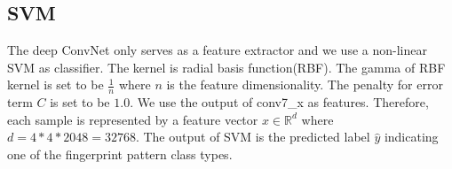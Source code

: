 \subsection{SVM}
\label{sec_svm}
The deep ConvNet only serves as a feature extractor and we use a non-linear SVM as classifier. The kernel is radial basis function(RBF). The gamma of RBF kernel  is set to be $\frac{1}{n}$ where $n$ is the feature dimensionality. The penalty for error term $C$ is set to be $1.0$. 
%
We use the output of  conv7\_x as features. Therefore, each sample is represented by a feature vector $x \in \mathbb{R}^d$ where $d=4*4*2048=32768$. The output of SVM is the predicted label $\hat{y} $ indicating one of the fingerprint pattern class types.
%







